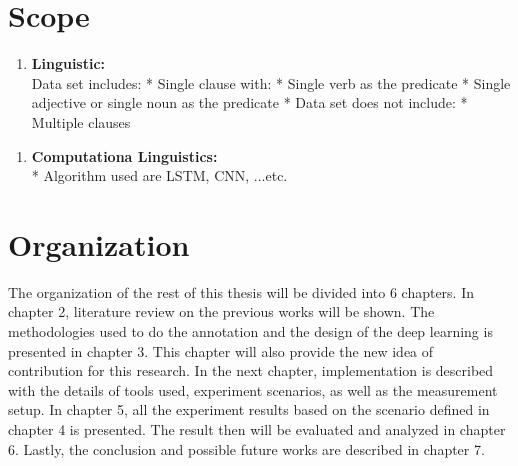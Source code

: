 \section{Scope}
\begin{enumerate}
	\item{\bf Linguistic:}\\
	Data set includes:
	* Single clause with:
	* Single verb as the predicate
	* Single adjective or single noun as the predicate
	* Data set does not include:
	* Multiple clauses
	
\end{enumerate}
\begin{enumerate}
	\item{\bf Computationa Linguistics:}\\
	* Algorithm used are LSTM, CNN, ...etc.
	
\end{enumerate}


\section{Organization}
The organization of the rest of this thesis will be divided into 6 chapters. In chapter 2, literature review on the previous works will be shown. The methodologies used to do the annotation and the design of the deep learning is presented in chapter 3. This chapter will also provide the new idea of contribution for this research. In the next chapter, implementation is described with the details of tools used, experiment scenarios, as well as the measurement setup. In chapter 5, all the experiment results based on the scenario defined in chapter 4 is presented. The result then will be evaluated and analyzed in chapter 6. Lastly, the conclusion and possible future works are described in chapter 7.

